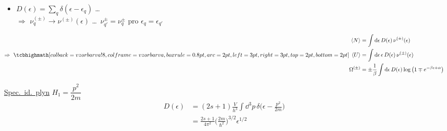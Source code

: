 \begin{itemize}
  \item $D(\epsilon) = \sum_q\delta(\epsilon - \epsilon_q)$ \quad \dots\  \\
        $\Rightarrow$ $\nu_q^{(\pm)}\to\nu^{(\pm)}(\epsilon)$ \quad \dots\ $\nu_{q'}^{\pm} = \nu_q^{\pm}$ pro $\epsilon_q = \epsilon_{q'}$
\end{itemize}

\begin{minipage}{0.6\textwidth}
\[
  \Rightarrow\ \vzorec{\begin{aligned}
    \langle N\rangle &= \int\dd\epsilon\,D(\epsilon)\,\nu^{(\pm)}(\epsilon) \\
    \langle U\rangle &= \int\dd\epsilon\,\epsilon\,D(\epsilon)\,\nu^{(\pm)}(\epsilon) \\
    \Omega^{(\pm)} &= \pm\frac1\beta\int\dd\epsilon\,D(\epsilon)\log\big(1 \mp e^{-\beta\epsilon + \alpha}\big)
  \end{aligned}}
\]
\end{minipage}
\begin{minipage}{0.38\textwidth}
\underline{Spec.\ id.\ plyn} \quad $H_1 = \dfrac{p^2}{2m}$
\begin{align*}
  D(\epsilon) &= (2s+1)\frac{V}{h^3}\int\dd^3p\,\delta\Big(\epsilon - \frac{p^2}{2m}\Big) \\
  &= \frac{2s+1}{4\pi^2}\Big(\frac{2m}{\hbar^2}\Big)^{3/2}\epsilon^{1/2}
\end{align*}
\end{minipage}

